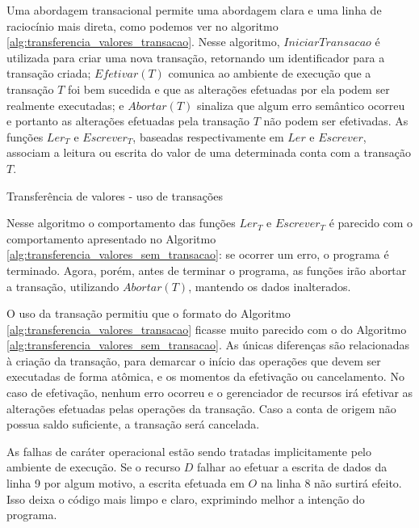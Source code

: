 \documentclass[11pt,twoside,a4paper]{book}
\begin{document}
Uma abordagem transacional permite uma abordagem clara e uma linha de raciocínio mais direta, como podemos ver no algoritmo \ref{alg:transferencia_valores_transacao}. Nesse algoritmo, $IniciarTransacao$ é utilizada para criar uma nova transação, retornando um identificador para a transação criada; $Efetivar(T)$ comunica ao ambiente de execução que a transação $T$ foi bem sucedida e que as alterações efetuadas por ela podem ser realmente executadas; e $Abortar(T)$ sinaliza que algum erro semântico ocorreu e portanto as alterações efetuadas pela transação $T$ não podem ser efetivadas. As funções $Ler_T$ e $Escrever_T$, baseadas respectivamente em $Ler$ e $Escrever$, associam a leitura ou escrita do valor de uma determinada conta com a transação $T$.

\begin{algorithm}
\caption{Transferência de valores - uso de transações}
\label{alg:transferencia_valores_transacao}
\end{algorithm}

Nesse algoritmo o comportamento das funções $Ler_T$ e $Escrever_T$ é parecido com o comportamento apresentado no Algoritmo \ref{alg:transferencia_valores_sem_transacao}: se ocorrer um erro, o programa é terminado. Agora, porém, antes de terminar o programa, as funções irão abortar a transação, utilizando $Abortar(T)$, mantendo os dados inalterados.

O uso da transação permitiu que o formato do Algoritmo \ref{alg:transferencia_valores_transacao} ficasse muito parecido com o do Algoritmo \ref{alg:transferencia_valores_sem_transacao}. As únicas diferenças são relacionadas à criação da transação, para demarcar o início das operações que devem ser executadas de forma atômica, e os momentos da efetivação ou cancelamento. No caso de efetivação, nenhum erro ocorreu e o gerenciador de recursos irá efetivar as alterações efetuadas pelas operações da transação. Caso a conta de origem não possua saldo suficiente, a transação será cancelada.

As falhas de caráter operacional estão sendo tratadas implicitamente pelo ambiente de execução. Se o recurso $D$ falhar ao efetuar a escrita de dados da linha 9 por algum motivo, a escrita efetuada em $O$ na linha 8 não surtirá efeito. Isso deixa o código mais limpo e claro, exprimindo melhor a intenção do programa.
\end{document}
